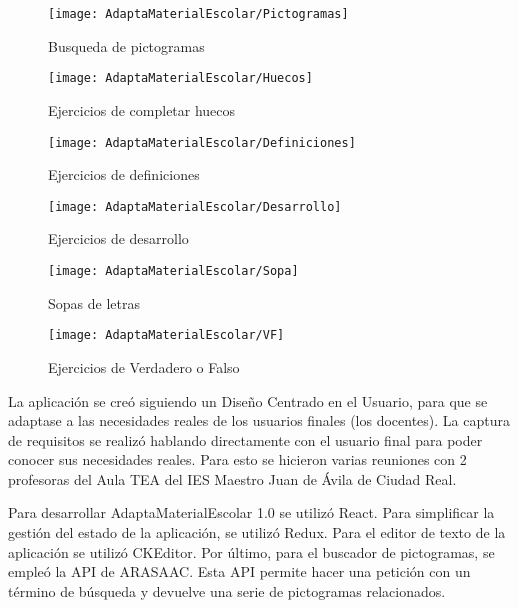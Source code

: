 \begin{figure}[ht!]
    \centering
    \texttt{[image:  AdaptaMaterialEscolar/Pictogramas]}
    \caption{Busqueda de pictogramas}
    \label{Pictogramas}
\end{figure}
\begin{figure}[ht!]
    \centering
    \texttt{[image:  AdaptaMaterialEscolar/Huecos]}
    \caption{Ejercicios de completar huecos}
    \label{Huecos}
\end{figure}
\begin{figure}[ht!]
    \centering
    \texttt{[image:  AdaptaMaterialEscolar/Definiciones]}
    \caption{Ejercicios de definiciones}
    \label{Definiciones}
\end{figure}
\begin{figure}[ht!]
    \centering
    \texttt{[image:  AdaptaMaterialEscolar/Desarrollo]}
    \caption{Ejercicios de desarrollo}
    \label{Desarrollo}
\end{figure}
\begin{figure}[ht!]
    \centering
    \texttt{[image:  AdaptaMaterialEscolar/Sopa]}
    \caption{Sopas de letras}
    \label{Sopa}
\end{figure}
\begin{figure}[ht!]
    \centering
    \texttt{[image:  AdaptaMaterialEscolar/VF]}
    \caption{Ejercicios de Verdadero o Falso}
    \label{VF}
\end{figure}
La aplicación se creó siguiendo un Diseño Centrado en el Usuario, para que se adaptase a las necesidades reales de los usuarios finales (los docentes). La captura de requisitos se realizó hablando directamente con el usuario final para poder conocer sus necesidades reales. Para esto se hicieron varias reuniones con 2 profesoras del Aula TEA del IES Maestro Juan de Ávila de Ciudad Real.

Para desarrollar AdaptaMaterialEscolar 1.0 se utilizó React. Para simplificar la gestión del estado de la aplicación, se utilizó Redux. Para el editor de texto de la aplicación se utilizó CKEditor. Por último, para el buscador de pictogramas, se empleó la API de ARASAAC. Esta API permite hacer una petición con un término de búsqueda y devuelve una serie de pictogramas relacionados.

